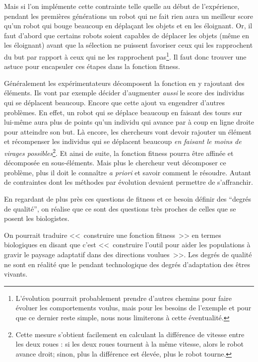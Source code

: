 Mais si l'on implémente cette contrainte telle quelle au début de l'expérience, pendant les premières générations un robot qui ne fait rien aura un meilleur score qu'un robot qui bouge beaucoup en déplaçant les objets et en les éloignant. Or, il faut d'abord que certains robots soient capables de déplacer les objets (même en les éloignant) avant que la sélection ne puissent favoriser ceux qui les rapprochent du but par rapport à ceux qui ne les rapprochent pas\footnote{L'évolution pourrait probablement prendre d'autres chemins pour faire évoluer les comportements voulus, mais pour les besoins de l'exemple et pour que ce dernier reste simple, nous nous limiterons à cette éventualité.}. Il faut donc trouver une astuce pour encapsuler ces étapes dans la fonction fitness.

Généralement les expérimentateurs décomposent la fonction en y rajoutant des éléments. Ils vont par exemple décider d'augmenter \emph{aussi} le score des individus qui se déplacent beaucoup. Encore que cette ajout va engendrer d'autres problèmes. En effet, un robot qui se déplace beaucoup en faisant des tours sur lui-même aura plus de points qu'un individu qui avance par à coup en ligne droite pour atteindre son but. Là encore, les chercheurs vont devoir rajouter un élément et récompenser les individus qui se déplacent beaucoup \emph{en faisant le moins de virages possibles}\footnote{Cette mesure s'obtient facilement en calculant la différence de vitesse entre les deux roues : si les deux roues tournent à la même vitesse, alors le robot avance droit; sinon, plus la différence est élevée, plus le robot tourne.}. Et ainsi de suite, la fonction fitness pourra être affinée et décomposée en sous-éléments. Mais plus le chercheur veut décomposer ce problème,  plus il doit le connaître \emph{a priori} et savoir comment le résoudre. Autant de contraintes dont  les méthodes par évolution devaient permettre de s'affranchir.

En regardant de plus près ces questions de fitness et ce besoin définir des ``degrés de qualité'', on réalise que ce sont des questions très proches de celles que se posent les biologistes.

On pourrait traduire <<~construire une fonction fitness~>> en termes biologiques en disant que c'est <<~construire l'outil pour aider les populations à gravir le paysage adaptatif dans des directions voulues~>>. Les degrés de qualité ne sont en réalité que le pendant technologique des degrés d'adaptation des êtres vivants.



